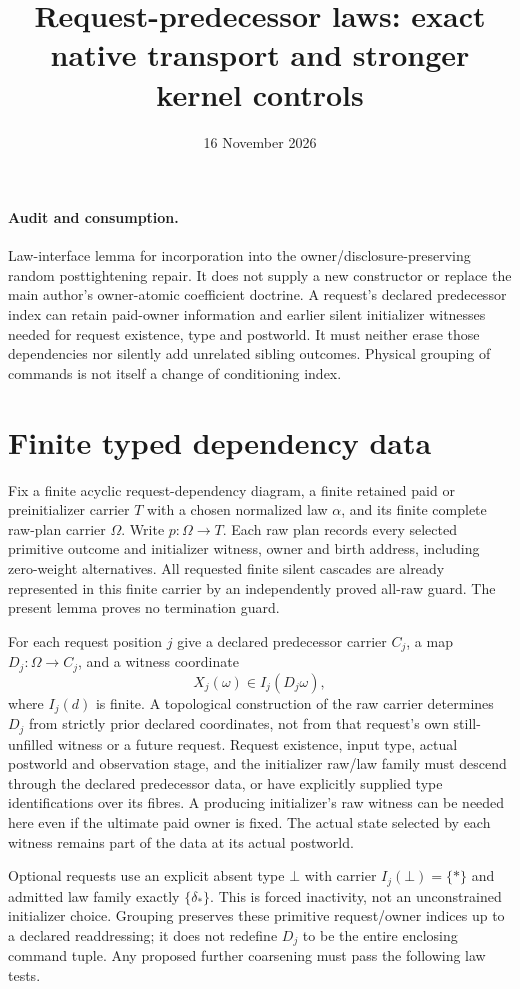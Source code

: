 \documentclass[11pt]{article}
\title{Request-predecessor laws: exact native transport and stronger kernel controls}
\date{16 November 2026}
\begin{document}
\maketitle
\paragraph{Audit and consumption.}
Law-interface lemma for incorporation into the owner/disclosure-preserving random posttightening repair. It does not supply a new constructor or replace the main author's owner-atomic coefficient doctrine. A request's declared predecessor index can retain paid-owner information and earlier silent initializer witnesses needed for request existence, type and postworld. It must neither erase those dependencies nor silently add unrelated sibling outcomes. Physical grouping of commands is not itself a change of conditioning index.

\section{Finite typed dependency data}
Fix a finite acyclic request-dependency diagram, a finite retained paid or preinitializer carrier $T$ with a chosen normalized law $\alpha$, and its finite complete raw-plan carrier $\Omega$. Write $p:\Omega\to T$. Each raw plan records every selected primitive outcome and initializer witness, owner and birth address, including zero-weight alternatives. All requested finite silent cascades are already represented in this finite carrier by an independently proved all-raw guard. The present lemma proves no termination guard.

For each request position $j$ give a declared predecessor carrier $C_j$, a map $D_j:\Omega\to C_j$, and a witness coordinate
\[
                  X_j(\omega)\in I_j(D_j\omega),       \tag{1}
\]
where $I_j(d)$ is finite. A topological construction of the raw carrier determines $D_j$ from strictly prior declared coordinates, not from that request's own still-unfilled witness or a future request. Request existence, input type, actual postworld and observation stage, and the initializer raw/law family must descend through the declared predecessor data, or have explicitly supplied type identifications over its fibres. A producing initializer's raw witness can be needed here even if the ultimate paid owner is fixed. The actual state selected by each witness remains part of the data at its actual postworld.

Optional requests use an explicit absent type $\bot$ with carrier $I_j(\bot)=\{*\}$ and admitted law family exactly $\{\delta_*\}$. This is forced inactivity, not an unconstrained initializer choice. Grouping preserves these primitive request/owner indices up to a declared readdressing; it does not redefine $D_j$ to be the entire enclosing command tuple. Any proposed further coarsening must pass the following law tests.
\end{document}
